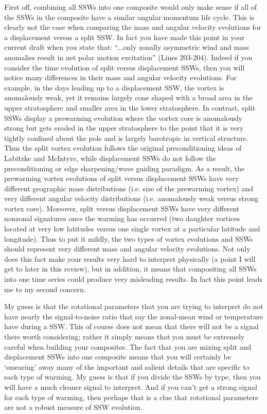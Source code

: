 \documentclass[a4paper,10pt]{article}
\begin{document}
\textcolor{reviewer}{First off, combining all SSWs into one composite would only make sense if all of the
SSWs in the composite have a similar angular momentum life cycle. This is clearly not
the case when comparing the mass and angular velocity evolutions for a displacement
versus a split SSW. In fact you have made this point in your current draft when you state
that: “...only zonally asymmetric wind and mass anomalies result in net polar motion
excitation” (Lines 203-204). Indeed if you consider the time evolution of split versus
displacement SSWs, then you will notice many differences in their mass and angular
velocity evolutions. For example, in the days leading up to a displacement SSW, the
vortex is anomalously weak, yet it remains largely cone shaped with a broad area in the
upper stratosphere and smaller area in the lower stratosphere. In contrast, split SSWs
display a prewarming evolution where the vortex core is anomalously strong but gets
eroded in the upper stratosphere to the point that it is very tightly confined about the pole
and is largely barotropic in vertical structure. Thus the split vortex evolution follows the
original preconditioning ideas of Labitzke and McIntyre, while displacement SSWs do
not follow the preconditioning or edge sharpening/wave guiding paradigm. As a result,
the prewarming vortex evolutions of split versus displacement SSWs have very different
geographic mass distributions (i.e. size of the prewarming vortex) and very different
angular velocity distributions (i.e. anomalously weak versus strong vortex core).
Moreover, split versus displacement SSWs have very different nonzonal signatures once
the warming has occurred (two daughter vortices located at very low latitudes versus one
single vortex at a particular latitude and longitude). Thus to put it mildly, the two types of
vortex evolutions and SSWs should represent very different mass and angular velocity
evolutions. Not only does this fact make your results very hard to interpret physically (a
point I will get to later in this review), but in addition, it means that compositing all
SSWs into one time series could produce very misleading results. In fact this point leads
me to my second concern.}

\textcolor{reviewer}{My guess is that the rotational parameters that you are trying to interpret do not have
nearly the signal-to-noise ratio that say the zonal-mean wind or temperature have during
a SSW. This of course does not mean that there will not be a signal there worth
considering; rather it simply means that you must be extremely careful when building
your composites. The fact that you are mixing split and displacement SSWs into one
composite means that you will certainly be ‘smearing’ away many of the important and
salient details that are specific to each type of warming. My guess is that if you divide the
SSWs by type, then you will have a much cleaner signal to interpret. And if you can’t get
a strong signal for each type of warming, then perhaps that is a clue that rotational
parameters are not a robust measure of SSW evolution.}
\end{document}

